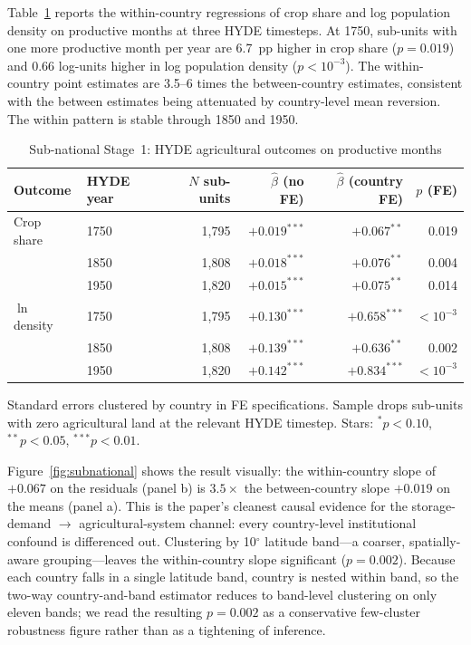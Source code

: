 \documentclass[11pt,letterpaper]{article}
\begin{document}
Table~\ref{tab:subnational} reports the within-country regressions of crop share and log population density on productive months at three HYDE timesteps. At 1750, sub-units with one more productive month per year are 6.7~pp higher in crop share ($p=0.019$) and 0.66 log-units higher in log population density ($p<10^{-3}$). The within-country point estimates are 3.5--6 times the between-country estimates, consistent with the between estimates being attenuated by country-level mean reversion. The within pattern is stable through 1850 and 1950.

\begin{table}[H]
\centering
\caption{Sub-national Stage~1: HYDE agricultural outcomes on productive months}
\label{tab:subnational}
\small
\begin{tabular}{llrrrr}
\toprule
Outcome & HYDE year & $N$ sub-units & $\hat\beta$ (no FE) & $\hat\beta$ (country FE) & $p$ (FE) \\
\midrule
Crop share        & 1750 & 1{,}795 & $+0.019^{***}$ & $+0.067^{**}$ & 0.019 \\
                  & 1850 & 1{,}808 & $+0.018^{***}$ & $+0.076^{**}$ & 0.004 \\
                  & 1950 & 1{,}820 & $+0.015^{***}$ & $+0.075^{**}$ & 0.014 \\
$\ln$ density     & 1750 & 1{,}795 & $+0.130^{***}$ & $+0.658^{***}$ & $<10^{-3}$ \\
                  & 1850 & 1{,}808 & $+0.139^{***}$ & $+0.636^{**}$  & 0.002 \\
                  & 1950 & 1{,}820 & $+0.142^{***}$ & $+0.834^{***}$ & $<10^{-3}$ \\
\bottomrule
\end{tabular}
\par\smallskip
\footnotesize{Standard errors clustered by country in FE specifications. Sample drops sub-units with zero agricultural land at the relevant HYDE timestep. Stars: $^{*}p<0.10$, $^{**}p<0.05$, $^{***}p<0.01$.}
\end{table}

Figure~\ref{fig:subnational} shows the result visually: the within-country slope of $+0.067$ on the residuals (panel b) is $3.5\times$ the between-country slope $+0.019$ on the means (panel a). This is the paper's cleanest causal evidence for the storage-demand $\to$ agricultural-system channel: every country-level institutional confound is differenced out. Clustering by 10$^\circ$ latitude band---a coarser, spatially-aware grouping---leaves the within-country slope significant ($p=0.002$). Because each country falls in a single latitude band, country is nested within band, so the two-way country-and-band estimator reduces to band-level clustering on only eleven bands; we read the resulting $p=0.002$ as a conservative few-cluster robustness figure rather than as a tightening of inference.
\end{document}
